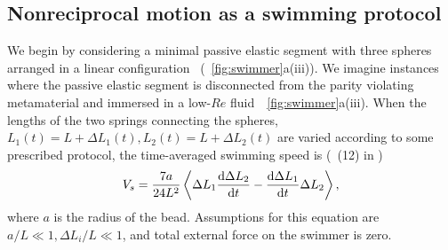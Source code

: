 \documentclass[
 preprint,
 preprintnumbers,
 amsmath,amssymb,
 aps,
 pre,
 longbibliography,
 superscriptaddress,
 10pt, twocolumn
]{revtex4-1}
\begin{document}
\subsection{Nonreciprocal motion as a swimming protocol}


 We begin by considering a minimal passive elastic segment with three spheres arranged in a linear configuration~\cite{Golestanian2008AnalyticResults} (\figurename~\ref{fig:swimmer}a(iii)). We imagine instances where the passive elastic segment is disconnected from the parity violating metamaterial and immersed in a low-$Re$ fluid~\figurename~\ref{fig:swimmer}a(iii). When the lengths of the two springs connecting the spheres, $L_1(t) = L+\Delta L_1(t), L_2(t) = L+\Delta L_2(t)$ are varied according to some prescribed protocol, the time-averaged swimming speed is (\eqnname~(12) in \cite{Golestanian2008AnalyticResults})
\begin{equation} \label{eqn:swimmer_speed}
    V_s = \frac{7a}{24L^2} \expval{\Delta L_1 \dv{\Delta L_2}{t} - \dv{\Delta L_1}{t} \Delta{L_2}},
\end{equation}
where $a$ is the radius of the bead. Assumptions for this equation are $a/L \ll 1, \Delta L_i/L \ll 1$, and total external force on the swimmer is zero.

\end{document}
